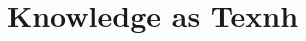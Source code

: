 \documentclass[11pt,letterpaper,oneside]{amsart} %
\begin{document}








\section{Knowledge as Texnh}
\label{knowledge}


\end{document}

